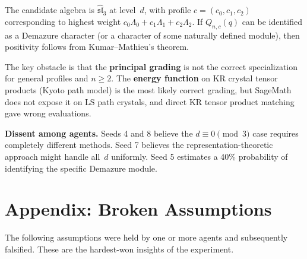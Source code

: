 \documentclass[11pt]{article}
\theoremstyle{definition}
\begin{document}
The candidate algebra is $\widehat{\mathfrak{sl}}_3$ at level~$d$, with profile $c = (c_0, c_1, c_2)$ corresponding to highest weight $c_0 \Lambda_0 + c_1 \Lambda_1 + c_2 \Lambda_2$. If $Q_{n,c}(q)$ can be identified as a Demazure character (or a character of some naturally defined module), then positivity follows from Kumar--Mathieu's theorem.

The key obstacle is that the \textbf{principal grading} is not the correct specialization for general profiles and $n \geq 2$. The \textbf{energy function} on KR crystal tensor products (Kyoto path model) is the most likely correct grading, but SageMath does not expose it on LS path crystals, and direct KR tensor product matching gave wrong evaluations.

\medskip\noindent\textbf{Dissent among agents.} Seeds 4 and 8 believe the $d \equiv 0\!\pmod{3}$ case requires completely different methods. Seed 7 believes the representation-theoretic approach might handle all~$d$ uniformly. Seed 5 estimates a 40\% probability of identifying the specific Demazure module.


\part*{Appendix: Broken Assumptions}

The following assumptions were held by one or more agents and subsequently falsified. These are the hardest-won insights of the experiment.
\end{document}
